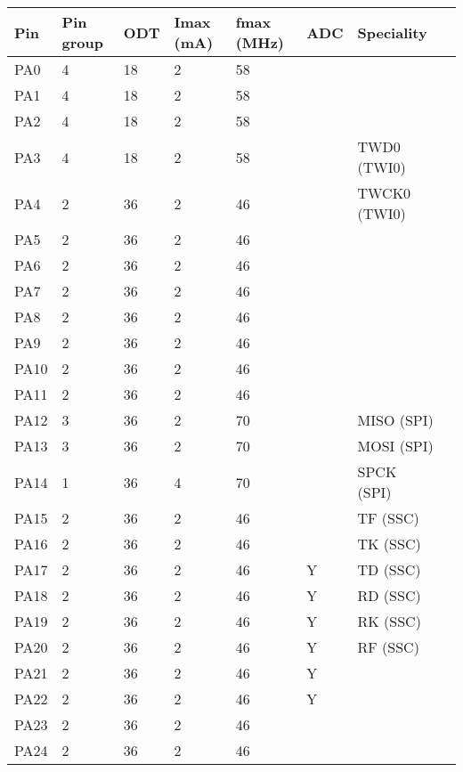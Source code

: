 \begin{table}
  \begin{tabular}{llllllll}
    Pin     & Pin group & ODT & Imax (mA) & fmax (MHz) & ADC & Speciality &     \\ \hline
    PA0     &  4 & 18 &  2 & 58 &   &     &    \\
    PA1     &  4 & 18 &  2 & 58 &   &     &    \\
    PA2     &  4 & 18 &  2 & 58 &   &      &    \\
    PA3     &  4 & 18 &  2 & 58 &   & TWD0  (TWI0)      &    \\
    PA4     &  2 & 36 &  2 & 46 &   & TWCK0 (TWI0)      &    \\
    PA5     &  2 & 36 &  2 & 46 &   &     &    \\
    PA6     &  2 & 36 &  2 & 46 &   &      &    \\
    PA7     &  2 & 36 &  2 & 46 &   &     &    \\
    PA8     &  2 & 36 &  2 & 46 &   &     &    \\
    PA9     &  2 & 36 &  2 & 46 &   &     &    \\
    PA10    &  2 & 36 &  2 & 46 &   &     &    \\
    PA11    &  2 & 36 &  2 & 46 &   &     &    \\
    PA12    &  3 & 36 &  2 & 70 &   & MISO (SPI)      &    \\
    PA13    &  3 & 36 &  2 & 70 &   & MOSI (SPI)      &    \\
    PA14    &  1 & 36 &  4 & 70 &   & SPCK (SPI)      &    \\
    PA15    &  2 & 36 &  2 & 46 &   & TF (SSC)      &    \\
    PA16    &  2 & 36 &  2 & 46 &   & TK (SSC)      &    \\
    PA17    &  2 & 36 &  2 & 46 & Y & TD (SSC)      &     \\
    PA18    &  2 & 36 &  2 & 46 & Y & RD (SSC)      &     \\
    PA19    &  2 & 36 &  2 & 46 & Y & RK (SSC)      &     \\
    PA20    &  2 & 36 &  2 & 46 & Y & RF (SSC)      &     \\
    PA21    &  2 & 36 &  2 & 46 & Y &     &     \\
    PA22    &  2 & 36 &  2 & 46 & Y &     &     \\
    PA23    &  2 & 36 &  2 & 46 &   &     &    \\
    PA24    &  2 & 36 &  2 & 46 &   &    &    \\

\end{tabular}
\end{table}
